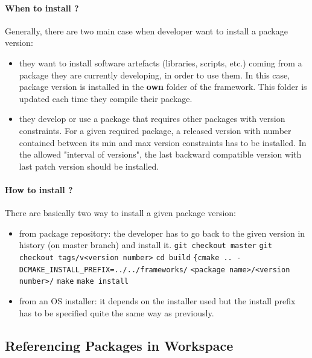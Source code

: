 \documentclass[12pt,a4paper]{article}
\begin{document}
\paragraph*{When to install ?}
Generally, there are two main case when developer want to install a package version:
\begin{itemize}
\item they want to install software artefacts (libraries, scripts, etc.) coming from a package they are currently developing, in order to use them. In this case, package version is installed in the \textbf{own} folder of the framework. This folder is updated each time they compile their package.
\item  they develop or use a package that requires other packages with version constraints. For a given required package, a released version with number contained between its min and max version constraints has to be installed. In the allowed "interval of versions", the last backward compatible version with last patch version should be installed.
\end{itemize}

\paragraph*{How to install ?}
There are basically two way to install a given package version:
\begin{itemize}
\item from package repository: the developer has to go back to the given version in history (on master branch) and install it.
\linebreak \texttt{git checkout master}
\linebreak \texttt{git checkout tags/v<version number>}
\linebreak \texttt{cd build}
\linebreak \verb|{cmake .. - DCMAKE_INSTALL_PREFIX=../../frameworks/|
\linebreak \verb|<package name>/<version number>/|
\linebreak \texttt{make}
\linebreak \texttt{make install}
\item from an OS installer: it depends on the installer used but the install prefix has to be specified quite the same way as previously.
\end{itemize}

\subsection{Referencing Packages in Workspace}
\end{document}
